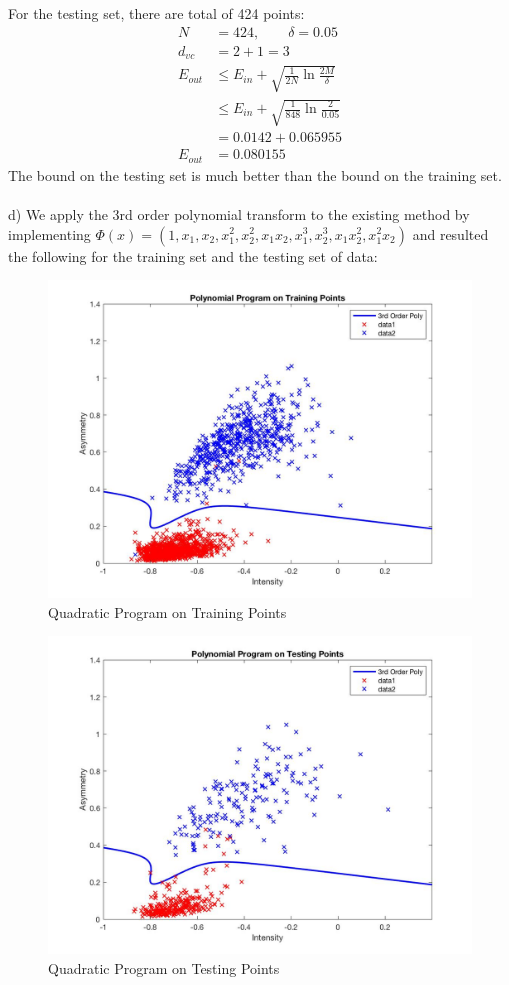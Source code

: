 \documentclass[12pt]{article}
\begin{document}
For the testing set, there are total of 424 points:
\begin{align*}\displaystyle
	N &= 424, \qquad \delta = 0.05 \\
	d_{vc} &= 2+1 = 3 \\
	E_{out} & \leq E_{in}+\sqrt{\frac{1}{2N}\ln \frac{2M}{\delta}}\\
	& \leq E_{in}+\sqrt{\frac{1}{848}\ln \frac{2}{0.05}}\\ 
	& = 0.0142 + 0.065955 \\
	E_{out} & =  0.080155
\end{align*}
The bound on the testing set is much better than the bound on the training set.\\\\
\indent d) We apply the 3rd order polynomial transform to the existing method by implementing $\Phi(x)=(1,x_1,x_2,x_1^2,x_2^2,x_1x_2,x_1^3,x_2^3,x_1x_2^2,x_1^2x_2)$ and resulted the following for the training set and the testing set of data: 
\begin{figure}[H]
  \centering
  \includegraphics[scale = 0.3]{Pic3.jpg}
  \caption{Quadratic Program on Training Points}
  \label{fig:Pic3}
\end{figure}
\begin{figure}[H]
  \centering
  \includegraphics[scale = 0.3]{Pic4.jpg}
  \caption{Quadratic Program on Testing Points}
  \label{fig:Pic4}
\end{figure}
\end{document}
